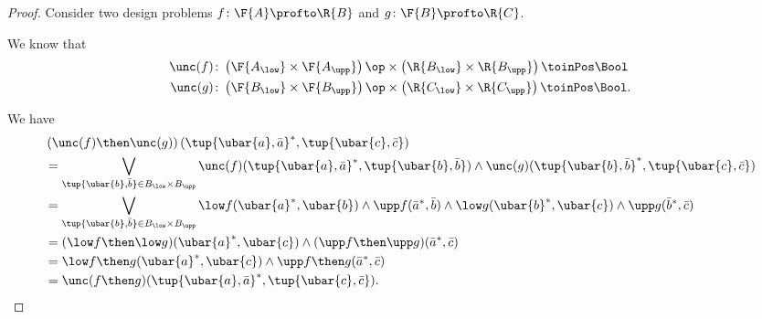 \begin{proof}
  Consider two design problems $f\colon \F{A}\profto \R{B}$ and $g\colon \F{B}\profto \R{C}$.

  We know that
  \begin{equation}
    \begin{aligned}
      \unc(f)&\colon \left( \F{A_{\low}}\times \F{A_{\upp}}\right)\op \times \left( \R{B_{\low}}\times \R{B_{\upp}}\right)\toinPos \Bool\\
      \unc(g)&\colon \left( \F{B_{\low}}\times \F{B_{\upp}}\right)\op \times \left( \R{C_{\low}}\times \R{C_{\upp}}\right)\toinPos \Bool.
    \end{aligned}
  \end{equation}

  We have
  \begin{equation}
    \begin{aligned}
      &\left(\unc(f)\then \unc(g)\right) (\tup{\ubar{a},\bar{a}}^*,\tup{\ubar{c},\bar{c}})\\
      &=\bigvee_{\tup{\ubar{b},\bar{b}}\in B_{\low}\times B_{\upp}} \unc(f)(\tup{\ubar{a},\bar{a}}^*,\tup{\ubar{b},\bar{b}})\wedge \unc(g)(\tup{\ubar{b},\bar{b}}^*,\tup{\ubar{c},\bar{c}})\\
      &= \bigvee_{\tup{\ubar{b},\bar{b}}\in B_{\low}\times B_{\upp}} \low f(\ubar{a}^*,\ubar{b})\wedge \upp f(\bar{a}^*,\bar{b})\wedge \low g(\ubar{b}^*,\ubar{c})\wedge \upp g(\bar{b}^*,\bar{c})\\
      &=(\low f\then \low g)(\ubar{a}^*,\ubar{c})\wedge (\upp f\then \upp g)(\bar{a}^*,\bar{c})\\
      &=\low f\then g (\ubar{a}^*,\ubar{c})\wedge \upp f\then g(\bar{a}^*,\bar{c})\\
      &=\unc(f\then g)(\tup{\ubar{a},\bar{a}}^*,\tup{\ubar{c},\bar{c}}).
    \end{aligned}
  \end{equation}
\end{proof}


